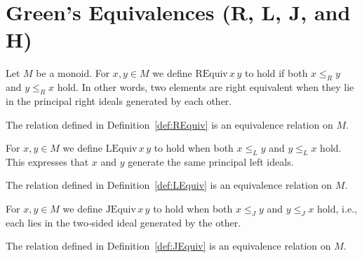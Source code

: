 
\section{Green's Equivalences (R, L, J, and H)}

\begin{definition}
\label{def:REquiv}
Let \(M\) be a monoid.  For \(x,y \in M\) we define \(\mathrm{REquiv}\,x\,y\) to hold if both \(x \le_R y\) and \(y \le_R x\) hold.  In other words, two elements are right equivalent when they lie in the principal right ideals generated by each other.
\leanok
\end{definition}

\begin{lemma}
\label{lem:REquiv-isEquivalence}
The relation defined in Definition~\ref{def:REquiv} is an equivalence relation on \(M\).
\leanok
{}
\end{lemma}

\begin{definition}
\label{def:LEquiv}
For \(x,y\in M\) we define \(\mathrm{LEquiv}\,x\,y\) to hold when both \(x \le_L y\) and \(y \le_L x\) hold.  This expresses that \(x\) and \(y\) generate the same principal left ideals.
\leanok
\end{definition}

\begin{lemma}
\label{lem:LEquiv-isEquivalence}
The relation defined in Definition~\ref{def:LEquiv} is an equivalence relation on \(M\).
\leanok
{}
\end{lemma}

\begin{definition}[J equivalence]
\label{def:JEquiv}
For \(x,y\in M\) we define \(\mathrm{JEquiv}\,x\,y\) to hold when both \(x \le_J y\) and \(y \le_J x\) hold, i.e., each lies in the two‑sided ideal generated by the other.
\leanok
\end{definition}

\begin{lemma}
\label{lem:JEquiv-isEquivalence}
The relation defined in Definition~\ref{def:JEquiv} is an equivalence relation on \(M\).
\leanok
{}
\end{lemma}

